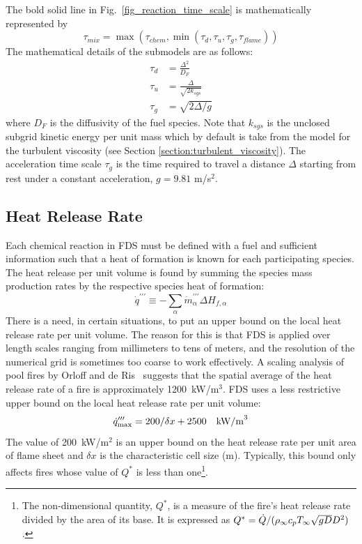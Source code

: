 The bold solid line in Fig.~\ref{fig_reaction_time_scale} is mathematically represented by
\begin{equation}
\label{eqn_tau_mix}
\tau_{mix} = \max(\tau_{chem},\min(\tau_d,\tau_u,\tau_g,\tau_{flame}))
\end{equation}
The mathematical details of the submodels are as follows:
\begin{align}
\label{eq:tau_diff} \tau_{d} &= \frac{\Delta^2}{D_F} \\
\label{eq:tau_sgs}  \tau_{u} &= \frac{\Delta}{\sqrt{2k_{sgs}}} \\
\label{eqn_tau_grav}\tau_{g} &= \sqrt{ 2\Delta/g }
\end{align}
where $D_F$ is the diffusivity of the fuel species. Note that $k_{sgs}$ is the unclosed subgrid kinetic energy per unit mass which by default is take from the model for the turbulent viscosity (see Section \ref{section:turbulent_viscosity}). The acceleration time scale $\tau_{g}$ is the time required to travel a distance $\Delta$ starting from rest under a constant acceleration, $g=9.81$ m/s$^2$.

\subsection{Heat Release Rate}

Each chemical reaction in FDS must be defined with a fuel and sufficient information such that a heat of formation is known for each participating species. The heat release per unit volume is found by summing the species mass production rates by the respective species heat of formation:
\begin{equation}\label{eq:vol_heat_gen}
\dot{q}^{\prime\prime\prime} \equiv -\displaystyle \sum_{\alpha} \dot{m}^{\prime\prime\prime}_{\alpha} \Delta H_{f,\alpha}
\end{equation}
There is a need, in certain situations, to put an upper bound on the local heat release rate per unit volume. The reason for
this is that FDS is applied over length scales ranging from millimeters to tens of meters, and the resolution of the numerical grid
is sometimes too coarse to work effectively.
A scaling analysis of pool fires by Orloff and de Ris~\cite{Orloff:19th_Symposium} suggests that the spatial average of the
heat release rate of a fire is approximately 1200~kW/m$^3$. FDS uses a less restrictive upper bound on the local heat release rate per unit volume:
\begin{equation}\label{eq:q_bound} 
\dot{q}_{\max}''' = 200/\delta x + 2500 \quad \hbox{kW/m}^3 
\end{equation}
The value of 200~kW/m$^2$ is an upper bound on the heat release rate per unit area of flame sheet and $\delta x$ is the characteristic cell size (m). Typically, this bound only affects fires whose value of $Q^*$ is less than one\footnote{The non-dimensional quantity, $Q^*$, is a measure of the fire's heat release rate divided by the
area of its base. It is expressed as $Q^*=\dot{Q}/(\rho_\infty c_p T_\infty \sqrt{g D} D^2)$.}.

